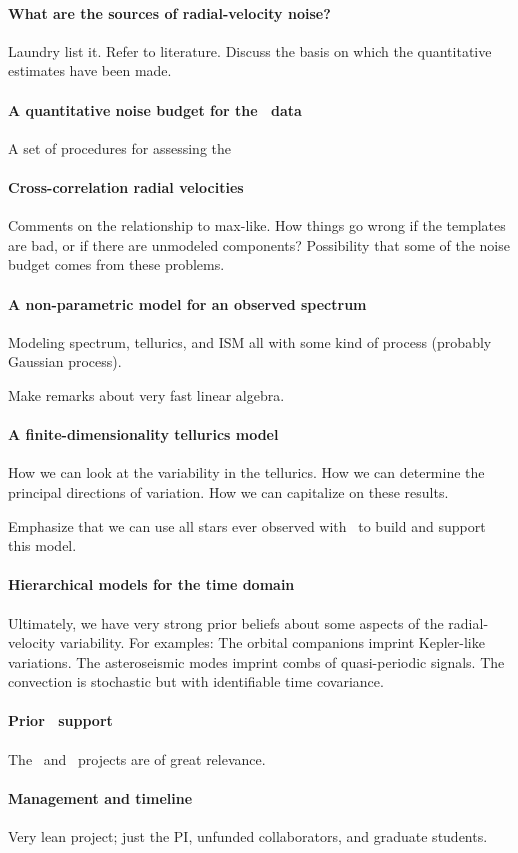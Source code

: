 \documentclass[12pt, fullpage, letterpaper]{article}
\begin{document}
\paragraph{What are the sources of radial-velocity noise?}
Laundry list it. Refer to literature. Discuss the basis on
which the quantitative estimates have been made.

\paragraph{A quantitative noise budget for the \HARPS\ data}
A set of procedures for assessing the 

\paragraph{Cross-correlation radial velocities}
Comments on the relationship to max-like. How things go wrong
if the templates are bad, or if there are unmodeled components?
Possibility that some of the noise budget comes from these
problems.

\paragraph{A non-parametric model for an observed spectrum}
Modeling spectrum, tellurics, and ISM all with some kind of
process (probably Gaussian process).

Make remarks about very fast linear algebra.

\paragraph{A finite-dimensionality tellurics model}
How we can look at the variability in the tellurics.
How we can determine the principal directions of variation.
How we can capitalize on these results.

Emphasize that we can use all stars ever observed with \HARPS\ to
build and support this model.

\paragraph{Hierarchical models for the time domain}
Ultimately, we have very strong prior beliefs about some aspects
of the radial-velocity variability. For examples: The orbital
companions imprint Kepler-like variations. The asteroseismic modes
imprint combs of quasi-periodic signals. The convection is stochastic
but with identifiable time covariance.

\paragraph{Prior \NASA\ support}
The \GALEX\ and \Ktwo\ projects are of great relevance.

\paragraph{Management and timeline}
Very lean project; just the PI, unfunded collaborators, and graduate students.
\end{document}
